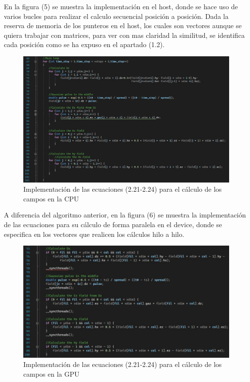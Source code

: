 \documentclass[11pt,a4paper,twoside,pdf]{article}
\numberwithin{equation}{section}
\begin{document}
En la figura (5) se muestra la implementación en el host, donde se hace uso de varios bucles para realizar el calculo secuencial posición a posición. Dada la reserva de memoria de los punteros en el host, los cuales son vectores aunque se quiera trabajar con matrices, para ver con mas claridad la similitud, se identifica cada posición como se ha expuso en el apartado (1.2).

\begin{figure}[h]
\centering
\includegraphics[width=15cm]{FD2D_Host_loop.jpg}				
\caption{Implementación de las ecuaciones (2.21-2.24) para el cálculo de los campos en la CPU }
\end{figure}
\noindent

A diferencia del algoritmo anterior, en la figura (6) se muestra la implementación de las ecuaciones para su cálculo de forma paralela en el device, donde se especifica en los vectores que realicen los cálculos hilo a hilo.

\begin{figure}[h]
\centering
\includegraphics[width=15cm]{FD2D_Kernel_loop.jpg}				
\caption{Implementación de las ecuaciones (2.21-2.24) para el cálculo de los campos en la GPU }
\end{figure}
\noindent
\end{document}
